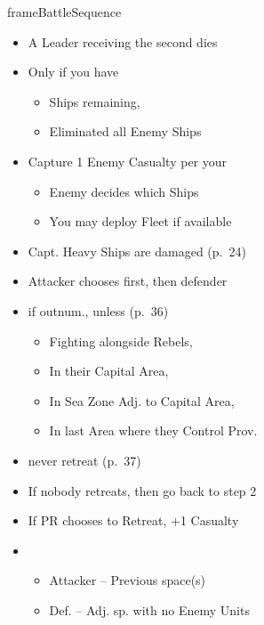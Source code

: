 \documentclass[10pt]{article}
\begin{document}
\begin{dynamiccontents*}{frameBattleSequence}
\begin{multicols}{3}
\begin{itemize}
\begin{itemize}
				\item Enemy Leader gets 1\illhealth per your 2\tercios
			\end{itemize}
			\item A Leader receiving the second \illhealth dies
		\end{itemize}
		\begin{itemize}
			\item Only if you have
			\begin{itemize}
				\item Ships remaining, 
				\item Eliminated all Enemy Ships
			\end{itemize}
			\item Capture 1 Enemy Casualty per your \tercios
			\begin{itemize}
				\item Enemy decides which Ships 
				\item You may deploy Fleet if available
			\end{itemize}
			\item Capt. Heavy Ships are damaged (p.~24)
		\end{itemize}
		\begin{itemize}
			\item Attacker chooses first, then defender
			\item {} if outnum., unless (p.~36)
			\begin{itemize}
				\item Fighting alongside Rebels, 
				\item In their Capital Area, 
				\item In Sea Zone Adj. to Capital Area, 
				\item In last Area where they Control Prov.
			\end{itemize}
			\item {} never retreat (p.~37)
			\item If nobody retreats, then go back to step 2
			\item If PR chooses to Retreat, +1 Casualty
			\item {}
			\begin{itemize}
				\item Attacker -- Previous space(s)
				\item Def. -- Adj. sp. with no Enemy Units
				\begin{itemize}

\end{itemize}
\end{itemize}
\end{itemize}
\end{multicols}
\end{dynamiccontents*}
\end{document}

